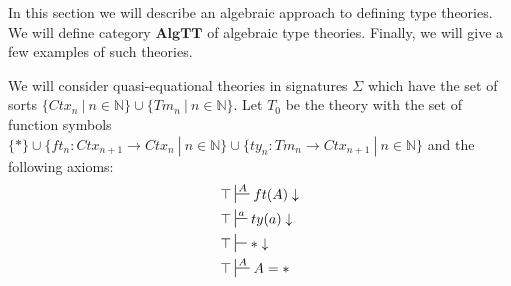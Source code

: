 \documentclass{amsart}
\theoremstyle{definition}
\theoremstyle{remark}
\newcommand{\cat}[1]{\mathbf{#1}}
\newcommand{\algtt}{\cat{AlgTT}}
\numberwithin{figure}{section}
\begin{document}
In this section we will describe an algebraic approach to defining type theories.
We will define category $\algtt$ of algebraic type theories.
Finally, we will give a few examples of such theories.

We will consider quasi-equational theories in signatures $\Sigma$ which have the set of sorts $\{ Ctx_n\ |\ n \in \mathbb{N} \} \cup \{ Tm_n\ |\ n \in \mathbb{N} \}$.
Let $T_0$ be the theory with the set of function symbols $\{ * \} \cup \{ ft_n : Ctx_{n+1} \to Ctx_n\ |\ n \in \mathbb{N} \} \cup \{ ty_n : Tm_n \to Ctx_{n+1}\ |\ n \in \mathbb{N} \}$ and the following axioms:
\begin{align*}
& \top \sststile{}{A} ft(A) \downarrow \\
& \top \sststile{}{a} ty(a) \downarrow \\
& \top \sststile{}{} * \downarrow \\
& \top \sststile{}{A} A = *
\end{align*}





\end{document}
